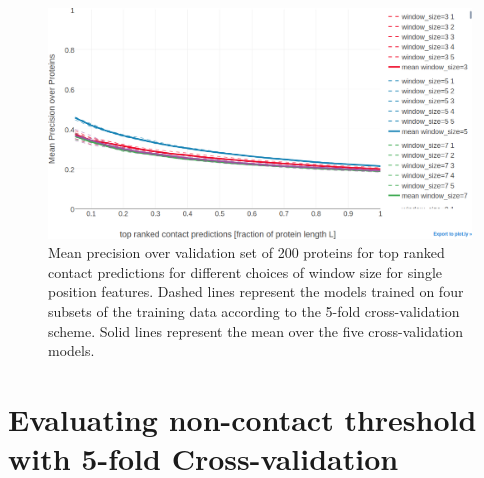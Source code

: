 \documentclass[11pt,a4paper,twoside]{book}
\theoremstyle{definition}
\theoremstyle{definition}
\theoremstyle{remark}
\begin{document}
\begin{figure}

{\centering \includegraphics[width=0.9\linewidth]{img/random_forest_contact_prior/cross_validation/precision_vs_rank_cv_on_test_random_forest_nestimators1000_maxfeatureslog2_maxdepth10_minsamplesleaf100_windowsize} 

}

\caption{Mean precision over
validation set of 200 proteins for top ranked contact predictions for
different choices of window size for single position features. Dashed
lines represent the models trained on four subsets of the training data
according to the 5-fold cross-validation scheme. Solid lines represent
the mean over the five cross-validation models.}\label{fig:random-forest-window-size-cv}
\end{figure}

\section{Evaluating non-contact threshold with 5-fold
Cross-validation}\label{rf-noncontact-threshold}
\end{document}
